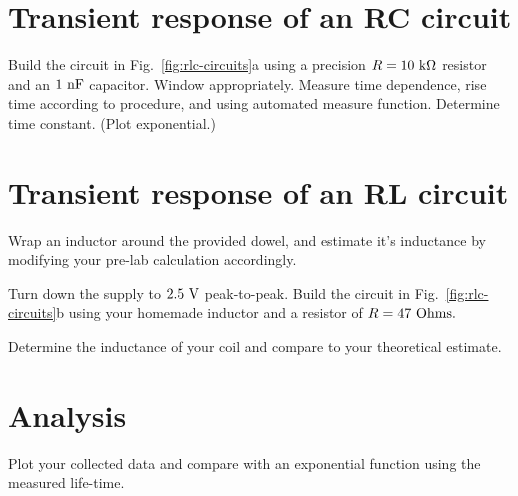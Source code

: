 \section{Transient response of an RC circuit}

Build the circuit in Fig.~\ref{fig:rlc-circuits}a using a precision $R=10~\rm k\Omega$ resistor and an $1~\rm nF$ capacitor.
Window appropriately.
Measure time dependence, rise time according to procedure, and using automated measure function.
Determine time constant.
(Plot exponential.)


\section{Transient response of an RL circuit}


Wrap an inductor around the provided dowel, and estimate it's inductance by modifying your pre-lab calculation accordingly.

Turn down the supply to $2.5~\rm V$ peak-to-peak.  Build the circuit in Fig.~\ref{fig:rlc-circuits}b using your homemade inductor and a resistor of $R=47~\rm Ohms.$

Determine the inductance of your coil and compare to your theoretical estimate.


\section{Analysis}

Plot your collected data and compare with an exponential function using the measured life-time.


